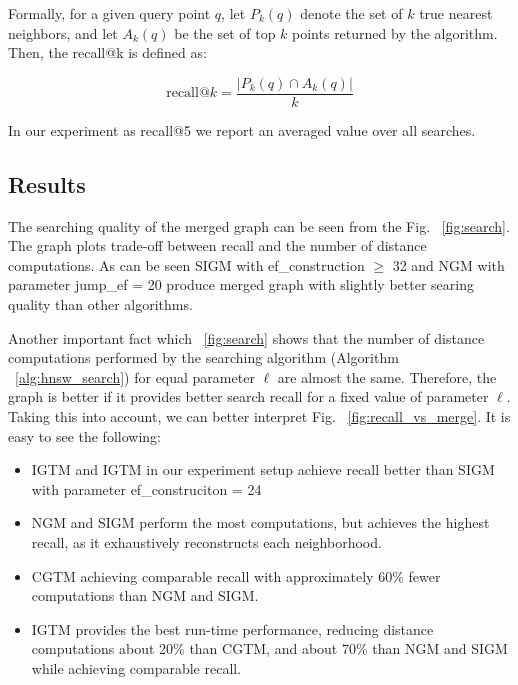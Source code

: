 \documentclass{article}
\begin{document}
Formally, for a given query point \(q\), let \(P_k(q)\) denote the set of \(k\) true nearest neighbors, and let \(A_k(q)\) be the set of top \(k\) points returned by the algorithm. Then, the recall@k is defined as:

\[
\text{recall@}k = \frac{|P_k(q) \cap A_k(q)|}{k}
\]

In our experiment as recall@5 we report an averaged value over all searches. 

\subsection{Results}

The searching quality of the merged graph can be seen from the Fig. ~\ref{fig:search}. The graph plots trade-off between recall and the number of distance computations. As can be seen \textsc{SIGM} with ef\_construction $\ge$ 32 and \textsc{NGM} with parameter jump\_ef = 20 produce merged graph with slightly better searing quality than other algorithms.

Another important fact which ~\ref{fig:search} shows that the number of distance computations performed by the searching algorithm (Algorithm ~\ref{alg:hnsw_search}) for equal parameter $\ell$ are almost the same.  Therefore, the graph is better if it provides better search recall for a fixed value of parameter $\ell$. Taking this into account, we can better interpret Fig. ~\ref{fig:recall_vs_merge}. It is easy to see the following:  

\begin{itemize}
    \item\textsc{IGTM} and \textsc{IGTM}  in our experiment setup  achieve recall better than \textsc{SIGM} with parameter ef\_construciton = 24
    \item \textsc{NGM} and \textsc{SIGM} perform the most computations, but achieves the highest recall, as it exhaustively reconstructs each neighborhood.
    \item \textsc{CGTM} achieving comparable recall with approximately 60\% fewer computations than \textsc{NGM} and \textsc{SIGM}.
    \item \textsc{IGTM} provides the best run-time performance, reducing distance computations about 20\% than \textsc{CGTM}, and about 70\% than \textsc{NGM} and \textsc{SIGM} while achieving comparable recall.
\end{itemize}

\end{document}

